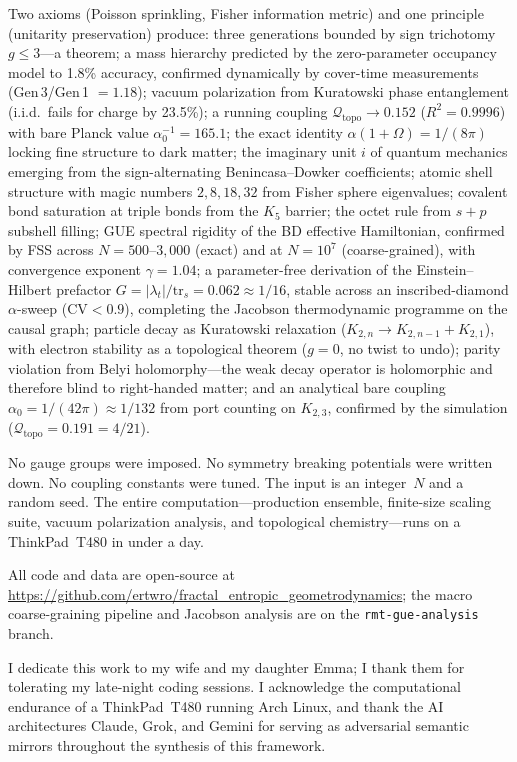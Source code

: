 \documentclass[aps,prd,twocolumn,superscriptaddress,nofootinbib,amsmath,amssymb,longbibliography]{revtex4-2}
\newcommand{\Qtopo}{\mathcal{Q}_{\mathrm{topo}}}
\begin{document}
Two axioms (Poisson sprinkling, Fisher information metric) and one
principle (unitarity preservation) produce:
three generations bounded by sign trichotomy $g \leq 3$---a theorem;
a mass hierarchy predicted by the zero-parameter occupancy model to
1.8\% accuracy, confirmed dynamically by cover-time measurements
(Gen\,3/Gen\,1 $= 1.18$);
vacuum polarization from Kuratowski phase entanglement (i.i.d.\ fails
for charge by 23.5\%);
a running coupling $\Qtopo \to 0.152$ ($R^2 = 0.9996$) with bare
Planck value $\alpha_0^{-1} = 165.1$;
the exact identity $\alpha(1 + \Omega) = 1/(8\pi)$ locking fine
structure to dark matter;
the imaginary unit $i$ of quantum mechanics emerging from the
sign-alternating Benincasa--Dowker coefficients;
atomic shell structure with magic numbers $2, 8, 18, 32$ from Fisher
sphere eigenvalues;
covalent bond saturation at triple bonds from the $K_5$ barrier;
the octet rule from $s + p$ subshell filling;
GUE spectral rigidity of the BD effective Hamiltonian,
confirmed by FSS across $N = 500$--$3{,}000$ (exact) and at
$N = 10^{7}$ (coarse-grained), with convergence exponent $\gamma = 1.04$;
a parameter-free derivation of the Einstein--Hilbert prefactor
$G = |\lambda_t|/\mathrm{tr}_s = 0.062 \approx 1/16$, stable across
an inscribed-diamond $\alpha$-sweep ($\mathrm{CV} < 0.9$), completing
the Jacobson thermodynamic programme on the causal graph;
particle decay as Kuratowski relaxation
($K_{2,n} \to K_{2,n-1} + K_{2,1}$), with electron stability as a
topological theorem ($g = 0$, no twist to undo);
parity violation from Belyi holomorphy---the weak decay operator is
holomorphic and therefore blind to right-handed matter;
and an analytical bare coupling
$\alpha_0 = 1/(42\pi) \approx 1/132$ from port counting on
$K_{2,3}$, confirmed by the simulation ($\Qtopo = 0.191 = 4/21$).

No gauge groups were imposed.  No symmetry breaking potentials were
written down.  No coupling constants were tuned.
The input is an integer~$N$ and a random seed.
The entire computation---production ensemble, finite-size scaling suite,
vacuum polarization analysis, and topological chemistry---runs on a
ThinkPad~T480 in under a day.

All code and data are open-source at
\url{https://github.com/ertwro/fractal_entropic_geometrodynamics};
the macro coarse-graining pipeline and Jacobson analysis are on
the \texttt{rmt-gue-analysis} branch.

\begin{acknowledgments}
I dedicate this work to my wife and my daughter Emma; I thank them for
tolerating my late-night coding sessions.
I acknowledge the computational endurance of a ThinkPad~T480 running
Arch Linux, and thank the AI architectures Claude, Grok, and Gemini
for serving as adversarial semantic mirrors throughout the synthesis
of this framework.
\end{acknowledgments}


\end{document}
